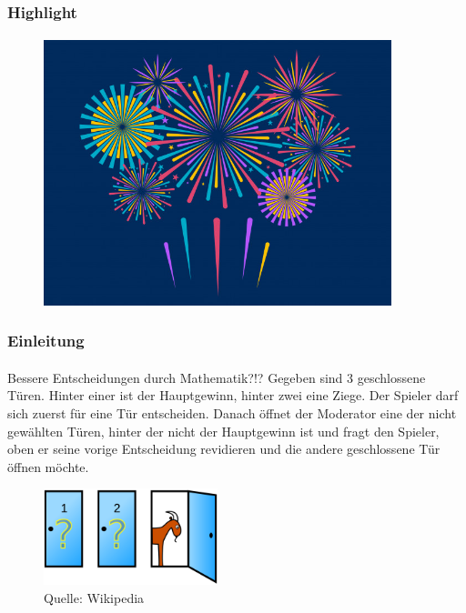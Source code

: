 \documentclass{beamer}
\begin{document}
\begin{frame}
    \frametitle{Highlight}
\framesubtitle{}
\begin{figure}[htp]
      \centering
    \includegraphics[width=0.9\textwidth]{img/firework}
\end{figure}
 \end{frame}


\begin{frame}
    \frametitle{Einleitung}
\framesubtitle{}

\begin{block}{Bessere Entscheidungen durch Mathematik?!?}
Gegeben sind 3 geschlossene Türen.  Hinter einer ist der Hauptgewinn, hinter zwei eine Ziege.
Der Spieler darf  sich zuerst für eine Tür entscheiden. 
Danach öffnet der Moderator eine der  nicht gewählten Türen, hinter der nicht der Hauptgewinn ist und fragt den Spieler, oben er seine vorige Entscheidung revidieren und die andere geschlossene Tür öffnen möchte.
\end{block}

\begin{figure}[htp]
      \centering
    \includegraphics[width=0.45\textwidth]{img/Monty_open}

      \caption{Quelle: Wikipedia}
\end{figure}

 \end{frame}
\end{document}
